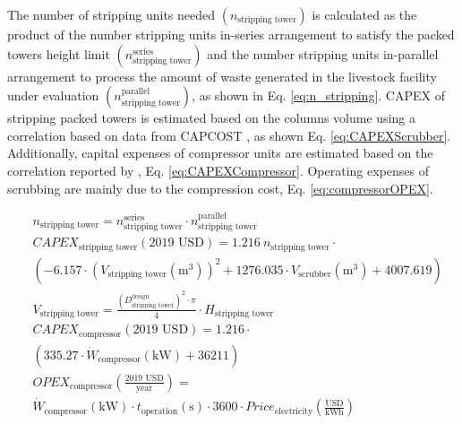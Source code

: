 \begin{refsection}[referencesCh6]

The number of stripping units needed $\left( n_{\text{stripping tower}} \right) $ is calculated as the product of the number stripping units in-series arrangement to satisfy the packed towers height limit $\left(n_{\text{stripping tower}}^{\text{series}} \right) $ and the number stripping units in-parallel arrangement to process the amount of waste generated in the livestock facility under evaluation $\left( n_{\text{stripping tower}}^{\text{parallel}} \right) $, as shown in Eq. \ref{eq:n_stripping}. CAPEX of stripping packed towers is estimated based on the columns volume using a correlation based on data from CAPCOST \citep{CAPCOST}, as shown Eq. \ref{eq:CAPEXScrubber}. Additionally, capital expenses of compressor units are estimated based on the correlation reported by \citet{almena2016technoeconomic}, Eq. \ref{eq:CAPEXCompressor}. Operating expenses of scrubbing are mainly due to the compression cost, Eq. \ref{eq:compressorOPEX}.

\begin{align}
	& n_{\text{stripping tower}} = n_{\text{stripping tower}}^{\text{series}} \cdot  n_{\text{stripping tower}}^{\text{parallel}} \label{eq:n_stripping} \\
	& CAPEX_{\text{stripping tower}} \left(\text{2019 USD}\right) = 1.216 \ n_{\text{stripping tower}} \cdot \label{eq:CAPEXScrubber}
	\\
	& \left(-6.157 \cdot \left(V_{\text{stripping tower}} \left(\text{m}^3\right)\right)^2 + 1276.035 \cdot V_{\text{scrubber}} \left(\text{m}^3\right) + 4007.619\right) \nonumber
	\\
	& V_{\text{stripping tower}} = \frac{\left(D_{\text{stripping tower}}^{\text{design}}\right)^2 \cdot \pi}{4} \cdot H_{\text{stripping tower}} 
	\\
	&
	CAPEX_{\text{compressor}} \left(\text{2019 USD}\right) = 1.216 \cdot \nonumber \\
	& \left(335.27 \cdot \dot{W}_{\text{compressor}} \left(\text{kW}\right) + 36211\right) \label{eq:CAPEXCompressor}
	\\
	& OPEX_{\text{compressor}} \left(\frac{\text{2019 USD}}{\text{year}}\right) = \label{eq:compressorOPEX} \\
	& \dot{W}_{\text{compressor}} \left(\text{kW}\right) \cdot t_{\text{operation}} \left(\text{s}\right) \cdot 3600 \cdot Price_{\text{electricity}}\left(\frac{\text{USD}}{\text{kWh}}\right) \nonumber
\end{align}	


\end{refsection}
